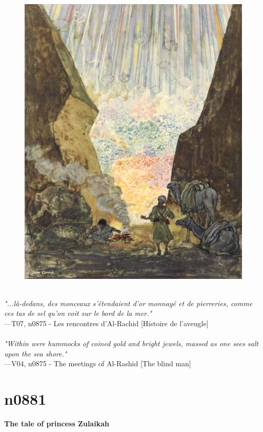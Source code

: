 \documentclass[../Carre_nights.tex]{subfiles}
\begin{document}
\begin{figure}[ht]
\centering
\includegraphics[height=\figsize]{illustrations/volume_7/T07, n0875 - Les rencontres d'Al-Rachid [Histoire de l'aveugle].jpg}
\end{figure}

\textit{\\
"...là-dedans, des monceaux s’étendaient d’or monnayé et de pierreries, comme ces tas de sel qu’on voit sur le bord de la mer."} \\
—T07, n0875 - Les rencontres d'Al-Rachid [Histoire de l'aveugle] \\~\\
\textit{"Within were hummocks of coined gold and bright jewels, massed as one sees salt upon the sea shore."} \\
—V04, n0875 - The meetings of Al-Rashid [The blind man]

\newpage

\section{n0881}
\textbf{\Large{The tale of princess Zulaikah}} \\
\end{document}

